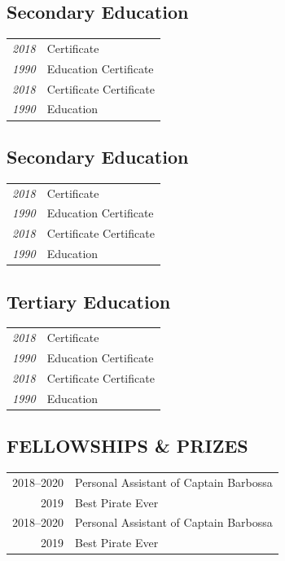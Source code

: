 \documentclass[11pt]{article}
\begin{document}

\subsection{Secondary Education}
\begin{tabular}{>{\itshape}r|l}
    2018 & Certificate \\
    1990 & Education Certificate \\
    2018 & Certificate Certificate\\
    1990 & Education
\end{tabular}


\subsection{Secondary Education}
\begin{tabular}{>{\itshape}r|l}
    2018 & Certificate \\
    1990 & Education Certificate \\
    2018 & Certificate Certificate\\
    1990 & Education
\end{tabular}

\vspace{1em}

\subsection{Tertiary Education}
\begin{tabular}{>{\itshape}r|l}
    2018 & Certificate \\
    1990 & Education Certificate \\
    2018 & Certificate Certificate\\
    1990 & Education
\end{tabular}


\subsection{FELLOWSHIPS \& PRIZES}
\begin{tabular}{r p{}}
2018--2020 & Personal Assistant of Captain Barbossa \\
2019 & Best Pirate Ever \\
2018--2020 & Personal Assistant of Captain Barbossa \\
2019 & Best Pirate Ever
\end{tabular}
\end{document}
